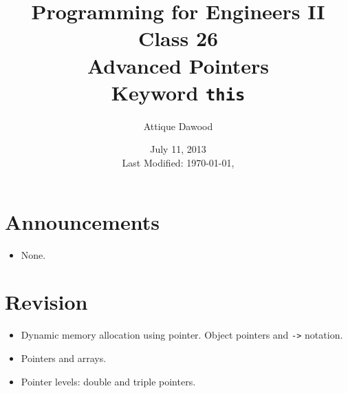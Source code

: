 \documentclass[12pt,a4paper]{article}
\title{\vspace{-2cm}Programming for Engineers II\\Class 26\\Advanced Pointers\\Keyword \texttt{this}}
\author{Attique Dawood}
\date{July 11, 2013\\[0.2cm] Last Modified: \today, \currenttime}
\begin{document}
\maketitle
\section{Announcements}
\begin{itemize}
\item None.
\end{itemize}
\section{Revision}
\begin{itemize}
\item Dynamic memory allocation using pointer. Object pointers and \verb|->| notation.
\item Pointers and arrays.
\item Pointer levels: double and triple pointers.
\end{itemize}
\end{document}
